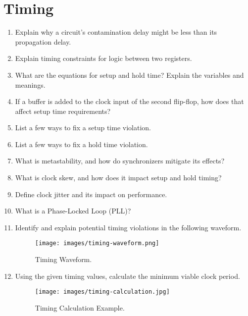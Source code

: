 \documentclass[11pt]{article}
\begin{document}
\section{Timing}
\begin{enumerate}
    \item Explain why a circuit's contamination delay might be less than its
    propagation delay.
    \item Explain timing constraints for logic between two registers.
    \item What are the equations for setup and hold time? Explain the variables
    and meanings.
    \item If a buffer is added to the clock input of the second flip-flop, how
    does that affect setup time requirements?
    \item List a few ways to fix a setup time violation.
    \item List a few ways to fix a hold time violation.
    \item What is metastability, and how do synchronizers mitigate its effects?
    \item What is clock skew, and how does it impact setup and hold timing?
    \item Define clock jitter and its impact on performance.
    \item What is a Phase-Locked Loop (PLL)?
    \item Identify and explain potential timing violations in the following
    waveform.
    \begin{figure}[H]
        \centering
        \texttt{[image: images/timing-waveform.png]}
        \caption{Timing Waveform.}
        \label{fig:timing_violation}
    \end{figure}
    \item Using the given timing values, calculate the minimum viable clock
    period.
    \begin{figure}[H]
        \centering
        \texttt{[image: images/timing-calculation.jpg]}
        \caption{Timing Calculation Example.}
        \label{fig:timing_calc}
    \end{figure}
\end{enumerate}

\end{document}
